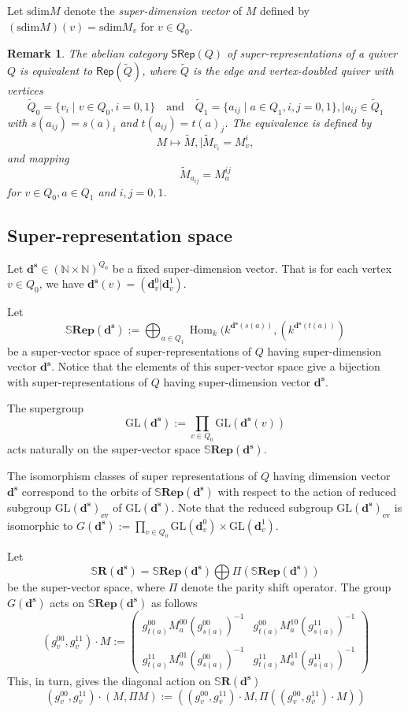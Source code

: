 \documentclass[12pt, reqno]{amsart}
\theoremstyle{plain}
\newtheorem{remark}[theorem]{Remark}
\numberwithin{equation}{section}
\def \d{\mathbf{d}}
\def \sd{\mathbf{d^s}}
\def \N{\mathbb{N}}
\def \bS{\mathbb{S}}
\def \bfR{\mathbf{Rep}}
\def \bbSR{\mathbb{S}\mathbf{R}}
\newcommand{\Hom}{\operatorname{Hom}\nolimits}
\newcommand{\sdim}{\mathrm{sdim}}
\begin{document}
Let $\sdim M$ denote the {\it super-dimension vector} of $M$ defined by
$(\sdim M)(v)= \sdim M_v$ for $v\in Q_0$.

\begin{remark}\label{Rem-tilde}
The abelian category $\mathsf{SRep}(Q)$ of super-representations 
of a quiver $Q$ is equivalent to $\mathsf{Rep}(\tilde{Q})$, where 
$\tilde{Q}$ is the edge and vertex-doubled quiver with vertices 
$$
\tilde{Q}_0 = \{v_i \mid v \in Q_0, i=0,1\}
\quad \mbox{and} \quad   
\tilde{Q}_1 = \{a_{ij} \mid a \in Q_1, i,j=0,1\}, \mid a_{ij} \in \tilde{Q}_1
$$
with $s(a_{ij}) = s(a)_i$ and $t(a_{ij}) = t(a)_j$. 
The equivalence is defined by 
$$
M \mapsto \tilde{M}, \mid \tilde{M}_{v_i} = M_v^i,
$$ and mapping 
$$
\tilde{M}_{a_{ij}} = M_a^{ij}
$$ for $v\in Q_0, a\in Q_1$ and $i,j = 0,1$. 
\end{remark}

\subsection{Super-representation space}
Let $\sd \in (\N \times \N)^{Q_0}$ be a fixed super-dimension vector. 
That is for each vertex $v\in Q_0$, we have $\sd(v) = (\d^0_v | \d^1_v)$.

Let 
$$
\bS \bfR(\sd):= \displaystyle \bigoplus_{a\in Q_1} 
\Hom_k(k^{\sd(s(a))}, (k^{\sd(t(a))})
$$
be a super-vector space of super-representations of $Q$ having super-dimension vector $\sd$. Notice that the elements of this super-vector space give a bijection with super-representations of $Q$ having super-dimension vector $\sd$.

The supergroup 
$$
\mathrm{GL}(\sd) := \prod_{v\in Q_0} \mathrm{GL}(\sd(v))
$$
acts naturally on the super-vector space $\bS \bfR(\sd)$.

The isomorphism classes of super representations of $Q$ having dimension vector $\sd$ correspond to the orbits of $\bS \bfR(\sd)$
with respect to the action of reduced subgroup $\mathrm{GL}(\sd)_{\mathrm{ev}}$ of $\mathrm{GL}(\sd)$. Note that the reduced subgroup $\mathrm{GL}(\sd)_{\mathrm{ev}}$ is isomorphic to 
$G(\sd) := \prod_{v\in Q_0} \mathrm{GL}(\d^0_v)\times \mathrm{GL}(\d^1_v)$.

Let 
$$
\bbSR(\sd) = \bS \bfR(\sd) \bigoplus \Pi (\bS \bfR(\sd))
$$
be the super-vector space, where $\Pi$ denote the parity shift operator. The group $G(\sd)$ acts on $\bS \bfR(\sd)$ as follows
\[
(g_v^{00}, g_v^{11}) \cdot M := \begin{pmatrix}
    g_{t(a)}^{00} M_a^{00} (g_{s(a)}^{00})^{-1} & g_{t(a)}^{00} M_a^{10} (g_{s(a)}^{11})^{-1} \\
    & \\
    g_{t(a)}^{11} M_a^{01} (g_{s(a)}^{00})^{-1} & g_{t(a)}^{11} M_a^{11} (g_{s(a)}^{11})^{-1} 
\end{pmatrix} 
\]
This, in turn, gives the diagonal action on $\bbSR(\sd)$
\[ 
(g_v^{00}, g_v^{11}) \cdot (M, \Pi M) := 
((g_v^{00}, g_v^{11}) \cdot M, \Pi ((g_v^{00}, g_v^{11}) \cdot M))
\]
\end{document}
